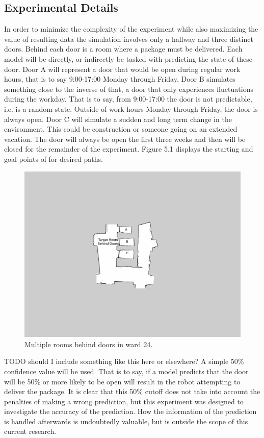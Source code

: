 \subsection{ Experimental Details }

In order to minimize the complexity of the experiment while also maximizing
the value of resulting data the simulation involves only a hallway and three
distinct doors.  Behind each door is a room where a package must be
delivered.  Each model will be directly, or indirectly be tasked with
predicting the state of these door. Door A will represent a door that would be
open during regular work hours, that is to say 9:00-17:00 Monday through
Friday. Door B simulates something close to the inverse of that, a door that
only experiences fluctuations during the workday.  That is to say, from
9:00-17:00 the door is not predictable, i.e. is a random state. Outside of
work hours Monday through Friday, the door is always open. Door C will
simulate a sudden and long term change in the environment. This could be
construction or someone going on an extended vacation. The door will always be
open the first three weeks and then will be closed for the remainder of the
experiment. Figure 5.1 displays the starting and goal points of for desired
paths.


\begin{figure}[!htb]
  \centering
  \includegraphics[width=\linewidth]{images/ward_24_door.png}
  \caption{Multiple rooms behind doors in ward 24. }
  \label{figure:ward_24_door}
\end{figure}

TODO should I include something like this here or elsewhere?
A simple 50\% confidence value will be used. That is to say, if a model
predicts that the door will be 50\% or more likely to be open will result in
the robot attempting to deliver the package.  It is clear that this 50\%
cutoff does not take into account the penalties of making a wrong prediction,
but this experiment was designed to investigate the accuracy of the
prediction. How the information of the prediction is handled afterwards is
undoubtedly valuable, but is outside the scope of this current research. \\


